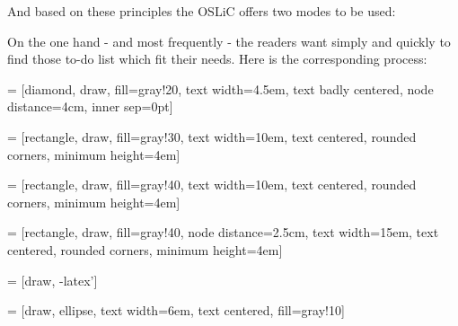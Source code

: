 And based on these principles the OSLiC offers two modes to be used:

On the one hand - and most frequently -  the readers want simply and quickly to
find those to-do list which fit their needs. Here is the corresponding process:

 = [diamond, draw, fill=gray!20, 
    text width=4.5em, text badly centered, node distance=4cm, inner sep=0pt]

 = [rectangle, draw, fill=gray!30, 
    text width=10em, text centered, rounded corners, minimum height=4em]
 
 = [rectangle, draw, fill=gray!40, 
    text width=10em, text centered, rounded corners, minimum height=4em]
    
 = [rectangle, draw, fill=gray!40, node distance=2.5cm,
    text width=15em, text centered, rounded corners, minimum height=4em]
    
 = [draw, -latex']

 = [draw, ellipse, text width=6em, text centered, fill=gray!10]
 
